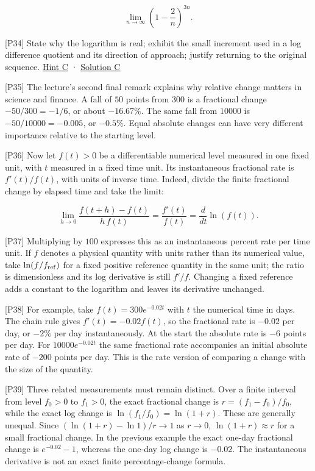 \documentclass[
  11pt,
]{article}
\providecommand{\gt}{>}
\begin{document}
\[
\lim_{n\to\infty}\left(1-\frac2n\right)^{3n}.
\]

{[}P34{]} State why the logarithm is real; exhibit the small increment
used in a log difference quotient and its direction of approach; justify
returning to the original sequence. \protect\hyperlink{hint-c}{Hint C} ·
\protect\hyperlink{solution-c}{Solution C}

{[}P35{]} The lecture's second final remark explains why relative change
matters in science and finance. A fall of \(50\) points from \(300\) is
a fractional change \(-50/300=-1/6\), or about \(-16.67\%\). The same
fall from \(10000\) is \(-50/10000=-0.005\), or \(-0.5\%\). Equal
absolute changes can have very different importance relative to the
starting level.

{[}P36{]} Now let \(f(t)\gt0\) be a differentiable numerical level
measured in one fixed unit, with \(t\) measured in a fixed time unit.
Its instantaneous fractional rate is \(f'(t)/f(t)\), with units of
inverse time. Indeed, divide the finite fractional change by elapsed
time and take the limit:

\[
\lim_{h\to0}\frac{f(t+h)-f(t)}{h\,f(t)}
=\frac{f'(t)}{f(t)}
=\frac{d}{dt}\ln(f(t)).
\]

{[}P37{]} Multiplying by \(100\) expresses this as an instantaneous
percent rate per time unit. If \(f\) denotes a physical quantity with
units rather than its numerical value, take \(\ln(f/f_{\rm ref})\) for a
fixed positive reference quantity in the same unit; the ratio is
dimensionless and its log derivative is still \(f'/f\). Changing a fixed
reference adds a constant to the logarithm and leaves its derivative
unchanged.

{[}P38{]} For example, take \(f(t)=300e^{-0.02t}\) with \(t\) the
numerical time in days. The chain rule gives \(f'(t)=-0.02f(t)\), so the
fractional rate is \(-0.02\) per day, or \(-2\%\) per day
instantaneously. At the start the absolute rate is \(-6\) points per
day. For \(10000e^{-0.02t}\) the same fractional rate accompanies an
initial absolute rate of \(-200\) points per day. This is the rate
version of comparing a change with the size of the quantity.

{[}P39{]} Three related measurements must remain distinct. Over a finite
interval from level \(f_0\gt0\) to \(f_1\gt0\), the exact fractional
change is \(r=(f_1-f_0)/f_0\), while the exact log change is
\(\ln(f_1/f_0)=\ln(1+r)\). These are generally unequal. Since
\((\ln(1+r)-\ln1)/r\to1\) as \(r\to0\), \(\ln(1+r)\approx r\) for a
small fractional change. In the previous example the exact one-day
fractional change is \(e^{-0.02}-1\), whereas the one-day log change is
\(-0.02\). The instantaneous derivative is not an exact finite
percentage-change formula.
\end{document}
